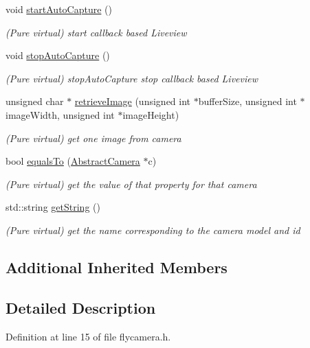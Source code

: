 \begin{DoxyCompactItemize}
void \mbox{\hyperlink{class_fly_camera_aa91c2cd580029a1fb242e2d8dace33b7}{start\+Auto\+Capture}} ()
\begin{DoxyCompactList}\small\item\em (Pure virtual) start callback based Liveview \end{DoxyCompactList}\item 
void \mbox{\hyperlink{class_fly_camera_a7d637bd9237fae3ee3cd55b044ec80f1}{stop\+Auto\+Capture}} ()
\begin{DoxyCompactList}\small\item\em (Pure virtual) stop\+Auto\+Capture stop callback based Liveview \end{DoxyCompactList}\item 
unsigned char $\ast$ \mbox{\hyperlink{class_fly_camera_a1c875e383a5a500a6a099a73fb3c54e3}{retrieve\+Image}} (unsigned int $\ast$buffer\+Size, unsigned int $\ast$image\+Width, unsigned int $\ast$image\+Height)
\begin{DoxyCompactList}\small\item\em (Pure virtual) get one image from camera \end{DoxyCompactList}\item 
bool \mbox{\hyperlink{class_fly_camera_a8121735229105485f73289a36bd41042}{equals\+To}} (\mbox{\hyperlink{class_abstract_camera}{Abstract\+Camera}} $\ast$c)
\begin{DoxyCompactList}\small\item\em (Pure virtual) get the value of that property for that camera \end{DoxyCompactList}\item 
std\+::string \mbox{\hyperlink{class_fly_camera_a97938fec7396d02574383f7db50d9e58}{get\+String}} ()
\begin{DoxyCompactList}\small\item\em (Pure virtual) get the name corresponding to the camera model and id \end{DoxyCompactList}\end{DoxyCompactItemize}
\subsection*{Additional Inherited Members}


\subsection{Detailed Description}


Definition at line 15 of file flycamera.\+h.



